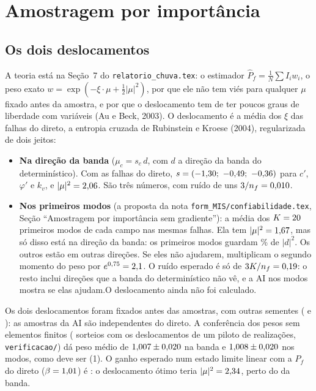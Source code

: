 \documentclass[11pt,a4paper]{article}
\begin{document}
\section{Amostragem por importância}\label{sec:ai}
\subsection{Os dois deslocamentos}
A teoria está na Seção~7 do \texttt{relatorio\_chuva.tex}: o estimador $\hat P_f = \frac1N\sum I_i w_i$, o peso exato
$w = \exp(-\xi\cdot\mu + \frac12|\mu|^2)$, por que ele não tem viés para qualquer $\mu$ fixado antes da amostra, e por
que o deslocamento tem de ter poucos graus de liberdade com \NVarKL{} variáveis (Au e Beck, 2003). O deslocamento é a média
dos $\xi$ das falhas do direto, a entropia cruzada de Rubinstein e Kroese (2004), regularizada de dois jeitos:
\begin{itemize}
\item \textbf{Na direção da banda} ($\mu_c = s_c\,d$, com $d$ a direção da banda do determinístico). Com as
\NfDireto{} falhas do direto, $s = (-1{,}30;\ -0{,}49;\ -0{,}36)$ para $c'$, $\varphi'$ e $k_v$, e $|\mu|^2 = 2{,}06$.
São três números, com ruído de uns $3/n_f = 0{,}010$.
\item \textbf{Nos primeiros modos} (a proposta da nota \texttt{form\_MIS/confiabilidade.tex}, Seção ``Amostragem por
importância sem gradiente''): a média dos $K = 20$ primeiros modos de cada campo nas mesmas falhas.
\ifmodosdesloc Ela tem $|\mu|^2 = 1{,}67$, mas só \MuDoisModosUtil{} disso está na direção da banda: os
\KModos{} primeiros modos guardam \DirecaoK\% de $|d|^2$. Os outros \MuDoisModosResto{} estão em outras direções. Se
eles não ajudarem, multiplicam o segundo momento do peso por $e^{0{,}75} = 2{,}1$. O ruído
esperado é só de $3K/n_f = 0{,}19$: o resto inclui direções que a banda do determinístico não vê, e a AI nos
modos mostra se elas ajudam.\else O deslocamento ainda não foi calculado.\fi
\end{itemize}
Os dois deslocamentos foram fixados antes das amostras, com outras sementes (\SementeBanda{} e \SementeModos): as
amostras da AI são independentes do direto. A conferência dos pesos sem elementos finitos (\SorteiosBanda{} sorteios
com os deslocamentos de um piloto de \PilotoVerif{} realizações, \texttt{verificacao/}) dá peso médio de
$1{,}007 \pm 0{,}020$ na banda e $1{,}008 \pm 0{,}020$ nos modos, como deve ser
(1). O ganho esperado num estado limite linear com a $P_f$ do direto ($\beta = 1{,}01$) é \GanhoLinear: o
deslocamento ótimo teria $|\mu|^2 = 2{,}34$, perto do \MuDoisBanda{} da banda.
\end{document}
